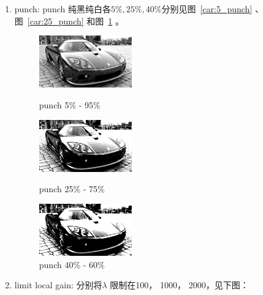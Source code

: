 \documentclass[a4paper,UTF8]{article}
\numberwithin{equation}{section}
\begin{document}
\begin{enumerate}[(\romannumeral1)]
	\item punch: punch 纯黑纯白各$5\%, 25\%, 40\%$分别见图~\ref{car:5_punch} 、图~\ref{car:25_punch} 和图~\ref{car:40_punch} 。

\begin{figure}[htbp]
\centering
\begin{minipage}[t]{0.30\textwidth}
\centering
\includegraphics[width=4cm]{car_punch_5.png}
\caption{ punch 5\% - 95\%}
\label{car:5_punch}
\end{minipage}
\centering
\begin{minipage}[t]{0.30\textwidth}
\centering
\includegraphics[width=4cm]{car_punch_25.png}
\caption{ punch 25\% - 75\%}
\label{car:25_punch}
\end{minipage}\centering
\begin{minipage}[t]{0.30\textwidth}
\centering
\includegraphics[width=4cm]{car_punch_40.png}
\caption{ punch 40\% - 60\%}
\label{car:40_punch}
\end{minipage}
\end{figure}


	\item limit local gain: 分别将$\lambda$ 限制在100， 1000， 2000，见下图：
\begin{figure}[H]


\end{figure}
\end{enumerate}
\end{document}
